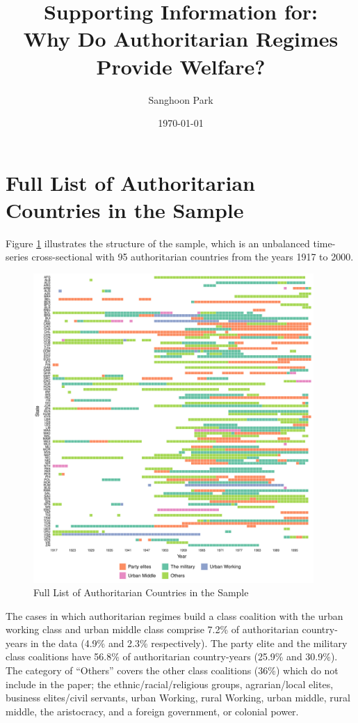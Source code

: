 \documentclass[12pt]{article}
\title{Supporting Information for: \\ Why Do Authoritarian Regimes Provide Welfare?}
\author{Sanghoon Park}
\date{\today}
\begin{document}
	\maketitle
	\tableofcontents
	
	\newpage
	
	\section{Full List of Authoritarian Countries in the Sample}
	Figure \ref{fig:figure6} illustrates the structure of the sample, which is an unbalanced time-series cross-sectional with 95 authoritarian countries from the years 1917 to 2000. 
	\begin{figure}[!ht]
		\centering
		\includegraphics[width=0.95\textwidth]{"2_Figures/Appendix/Appendix1_sample"}
		\caption{Full List of Authoritarian Countries in the Sample}
		\label{fig:figure6}
	\end{figure}
	The cases in which authoritarian regimes build a class coalition with the urban working class and urban middle class comprise 7.2\% of authoritarian country-years in the data (4.9\% and 2.3\% respectively). The party elite and the military class coalitions have 56.8\% of authoritarian country-years (25.9\% and 30.9\%). The category of ``Others'' covers the other class coalitions (36\%) which do not include in the paper; the ethnic/racial/religious groups, agrarian/local elites, business elites/civil servants, urban Working, rural Working, urban middle, rural middle, the aristocracy, and a foreign government, or colonial power. 
	
\end{document}
